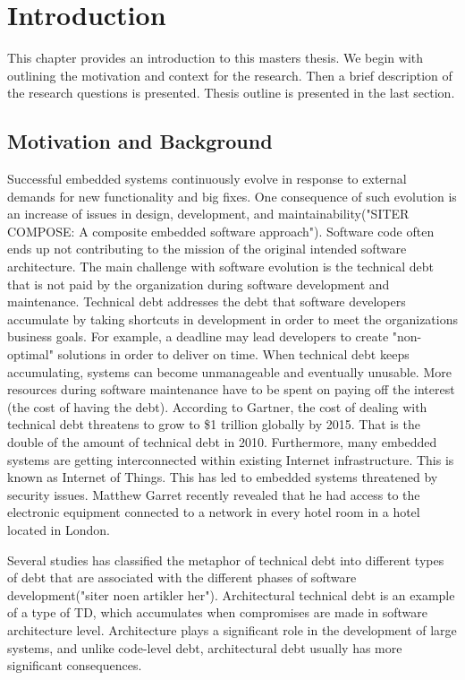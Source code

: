 
\chapter{Introduction}

This chapter provides an introduction to this masters thesis. We begin with outlining the motivation and context for the research. Then a brief description of the research questions is presented. Thesis outline is presented in the last section.


\section{Motivation and Background}
Successful embedded systems continuously evolve in response to external demands for new functionality and big fixes\cite{graaf2003embedded}. One consequence of such evolution is an increase of issues in design, development, and maintainability("SITER COMPOSE: A composite embedded software approach"). Software code often ends up not contributing to the mission of the original intended software architecture. The main challenge with software evolution is the technical debt that is not paid by the organization during software development and maintenance. Technical debt addresses the debt that software developers accumulate by taking shortcuts in development in order to meet the organizations business goals. For example, a deadline may lead developers to create "non-optimal" solutions in order to deliver on time. When technical debt keeps accumulating, systems can become unmanageable and eventually unusable. More resources during software maintenance have to be spent on paying off the interest (the cost of having the debt). According to Gartner\cite{gartner2010}, the cost of dealing with technical debt threatens to grow to \$1 trillion globally by 2015. That is the double of the amount of technical debt in 2010. Furthermore, many embedded systems are getting interconnected within existing Internet infrastructure. This is known as Internet of Things. This has led to embedded systems threatened by security issues. Matthew Garret recently revealed that he had access to the electronic equipment connected to a network in every hotel room in a hotel located in London.

Several studies has classified the metaphor of technical debt into different types of debt that are associated with the different phases of software development("siter noen artikler her"). Architectural technical debt is an example of a type of TD, which accumulates when compromises are made in software architecture level. Architecture plays a significant role in the development of large systems\cite{krutchen}, and unlike code-level debt, architectural debt usually has more significant consequences\cite{mo2013mapping}. 


